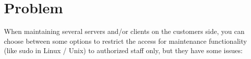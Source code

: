 %
%
%
%
%
%
%


\section{Problem}

When maintaining several servers and/or clients on the customers side, you can
choose between some options to restrict the access for maintenance functionality
(like sudo in Linux / Unix) to authorized staff only, but they have some issues:

